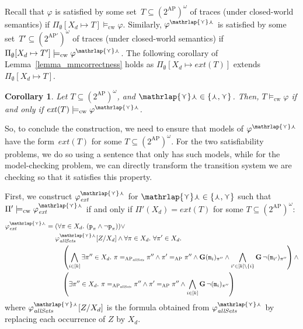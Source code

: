 \documentclass[dvipsnames,10pt,a4paper]{amsart}
\newtheorem{cor}[thm]{Corollary}
\theoremstyle{definition}
\theoremstyle{remark}
\renewcommand{\phi}{\varphi}
\newcommand{\pow}[1]{2^{#1}}
\newcommand{\set}[1]{\{#1\}}
\newcommand{\G}{\mathop{\mathbf{G}\vphantom{a}}\nolimits}
\newcommand{\ap}[0]{\mathrm{AP}}
\newcommand{\unidisvar}{X_d}
\newcommand{\smallest}{\curlyvee}
\newcommand{\largest}{\curlywedge}
\newcommand{\smalar}{{\mathrlap{\curlyvee}\curlywedge}}
\newcommand{\proposition}{\texttt{p}}
\newcommand{\allsets}{{\mathit{allSets}}}
\newcommand{\cw}{\mathrm{cw}}
\newcommand{\equals}[3]{#1 =_{#3} #2}
\newcommand{\marker}{\texttt{m}}
\newcommand{\extend}{\mathit{ext}}
\begin{document}
Recall that $\phi$ is satisfied by some set~$T \subseteq (\pow{\ap})^\omega$ of traces (under closed-world semantics) if $\Pi_\emptyset[\unidisvar\mapsto T] \models_\cw \varphi$.
Similarly, $\phi^\smalar$ is satisfied by some set~$T' \subseteq (\pow{\ap'})^\omega$ of traces (under closed-world semantics) if $\Pi_\emptyset[\unidisvar\mapsto T'] \models_\cw \varphi^\smalar$.
The following corollary of Lemma~\ref{lemma_mmcorrectness} holds as $\Pi_\emptyset[\unidisvar\mapsto \extend(T)]$ extends $\Pi_\emptyset[\unidisvar\mapsto T]$.

\begin{cor}
\label{coro_mmcorrectness}
Let $T\subseteq (\pow{\ap})^\omega$, and $\smalar \in \set{\largest,\smallest}$. Then, $T \models_\cw \phi$ if and only if $\extend(T) \models_\cw \phi^\smalar$.
\end{cor}

So, to conclude the construction, we need to ensure that models of $\phi^\smalar$ have the form~$\extend(T)$ for some $T \subseteq (\pow{\ap})^\omega$.
For the two satisfiability problems, we do so using a sentence that only has such models, while for the model-checking problem, we can directly transform the transition system we are checking so that it satisfies this property.

First, we construct $\phi_\extend^{\smalar}$ for $\smalar \in \set{\largest,\smallest}$ such that $\Pi'\models_\cw \phi_\extend^{\smalar}$ if and only if $\Pi'(\unidisvar) = \extend(T)$ for some $T \subseteq (\pow{\ap})^\omega$:
\begin{align*}
\phi_\extend^{\smalar} ={}&{} (\forall \pi \in \unidisvar.\ (\proposition_\pi \wedge \neg \proposition_\pi)) \vee \\
{}&{}\phi_\allsets^{\smalar}[Z/\unidisvar] \wedge \forall \pi \in \unidisvar.\ \forall \pi' \in \unidisvar.\ \\
{}&{}\quad
\left(
\bigwedge_{i \in [k]} \exists \pi'' \in \unidisvar.\ 
\equals{\pi}{\pi''}{\ap_\allsets} \wedge 
\equals{\pi'}{\pi''}{\ap} \wedge 
\G (\marker_i)_{\pi''} \wedge \bigwedge_{i' \in [k]\setminus\set{i}} \G\neg(\marker_{i'})_{\pi''}
\right) \wedge\\
{}&{}\quad
\left( 
 \exists \pi'' \in \unidisvar.\ 
\equals{\pi}{\pi''}{\ap_\allsets} \wedge 
\equals{\pi'}{\pi''}{\ap} \wedge 
\bigwedge_{i \in [k]} \G\neg(\marker_{i})_{\pi''}
\right)
\end{align*}
where $\phi_\allsets^{\smalar}[Z/\unidisvar]$ is the formula obtained from $\phi_\allsets^{\smalar}$ by replacing each occurrence of $Z$ by $\unidisvar$.
\end{document}
